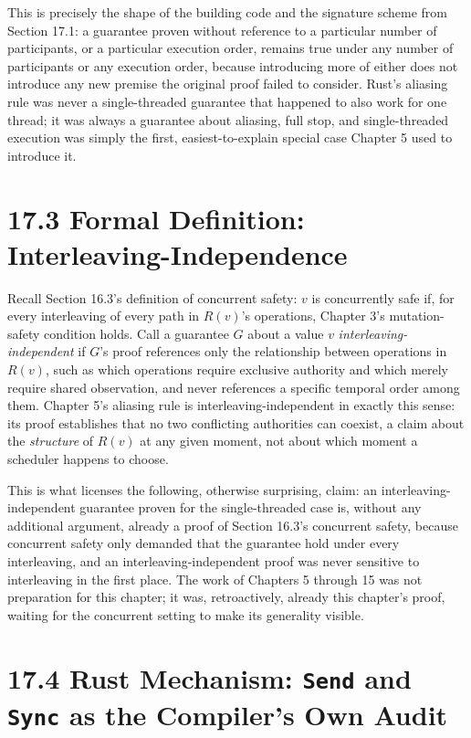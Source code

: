 \documentclass[11pt]{book}
\begin{document}
This is precisely the shape of the building code and the signature scheme from Section 17.1: a guarantee proven without reference to a particular number of participants, or a particular execution order, remains true under any number of participants or any execution order, because introducing more of either does not introduce any new premise the original proof failed to consider. Rust's aliasing rule was never a single-threaded guarantee that happened to also work for one thread; it was always a guarantee about aliasing, full stop, and single-threaded execution was simply the first, easiest-to-explain special case Chapter 5 used to introduce it.

\section*{17.3 Formal Definition: Interleaving-Independence}

Recall Section 16.3's definition of concurrent safety: $v$ is concurrently safe if, for every interleaving of every path in $R(v)$'s operations, Chapter 3's mutation-safety condition holds. Call a guarantee $G$ about a value $v$ \emph{interleaving-independent} if $G$'s proof references only the relationship between operations in $R(v)$, such as which operations require exclusive authority and which merely require shared observation, and never references a specific temporal order among them. Chapter 5's aliasing rule is interleaving-independent in exactly this sense: its proof establishes that no two conflicting authorities can coexist, a claim about the \emph{structure} of $R(v)$ at any given moment, not about which moment a scheduler happens to choose.

This is what licenses the following, otherwise surprising, claim: an interleaving-independent guarantee proven for the single-threaded case is, without any additional argument, already a proof of Section 16.3's concurrent safety, because concurrent safety only demanded that the guarantee hold under every interleaving, and an interleaving-independent proof was never sensitive to interleaving in the first place. The work of Chapters 5 through 15 was not preparation for this chapter; it was, retroactively, already this chapter's proof, waiting for the concurrent setting to make its generality visible.

\section*{17.4 Rust Mechanism: \texttt{Send} and \texttt{Sync} as the Compiler's Own Audit}
\end{document}
